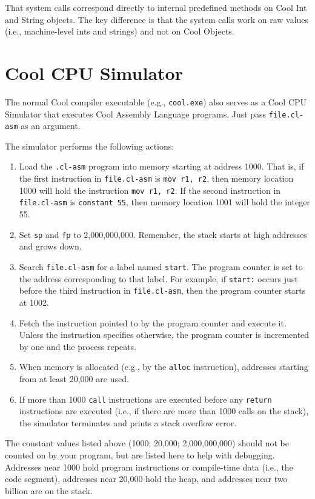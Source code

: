 \documentclass[]{article}
\begin{document}
That system calls correspond directly to internal predefined methods on
Cool Int and String objects. The key difference is that the system calls
work on raw values (i.e., machine-level ints and strings) and not on
Cool Objects.

\section{Cool CPU Simulator}

The normal Cool compiler executable (e.g., \texttt{cool.exe}) also
serves as a Cool CPU Simulator that executes Cool Assembly Language
programs. Just pass \texttt{file.cl-asm} as an argument.

The simulator performs the following actions:

\begin{enumerate}
\itemsep1pt\parskip0pt
\item
  Load the \texttt{.cl-asm} program into memory starting at address
  1000. That is, if the first instruction in \texttt{file.cl-asm} is
  \texttt{mov r1, r2}, then memory location 1000 will hold the
  instruction \texttt{mov r1, r2}. If the second instruction in
  \texttt{file.cl-asm} is \texttt{constant 55}, then memory location
  1001 will hold the integer 55.
\item
  Set \texttt{sp} and \texttt{fp} to 2,000,000,000. Remember, the stack
  starts at high addresses and grows down.
\item
  Search \texttt{file.cl-asm} for a label named \texttt{start}. The
  program counter is set to the address corresponding to that label. For
  example, if \texttt{start:} occurs just before the third instruction
  in \texttt{file.cl-asm}, then the program counter starts at 1002.
\item
  Fetch the instruction pointed to by the program counter and execute
  it. Unless the instruction specifies otherwise, the program counter is
  incremented by one and the process repeats.
\item
  When memory is allocated (e.g., by the \texttt{alloc} instruction),
  addresses starting from at least 20,000 are used.
\item
  If more than 1000 \texttt{call} instructions are executed before any
  \texttt{return} instructions are executed (i.e., if there are more
  than 1000 calls on the stack), the simulator terminates and prints a
  stack overflow error.
\end{enumerate}

The constant values listed above (1000; 20,000; 2,000,000,000) should
not be counted on by your program, but are listed here to help with
debugging. Addresses near 1000 hold program instructions or compile-time
data (i.e., the code segment), addresses near 20,000 hold the heap, and
addresses near two billion are on the stack.
\end{document}
